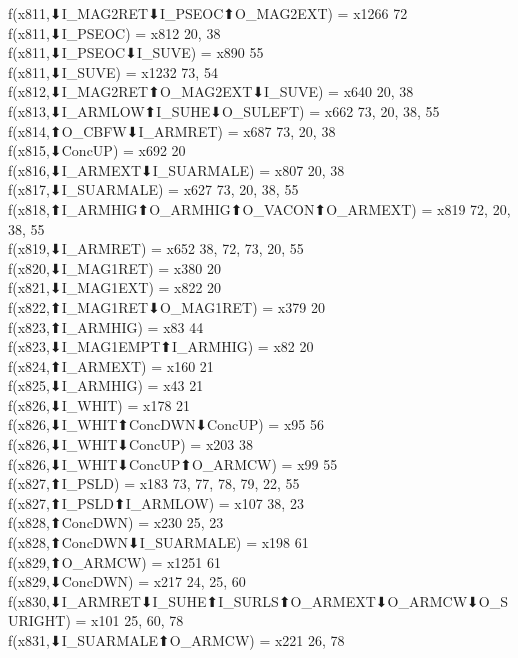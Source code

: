 f(x811,⬇I_MAG2RET⬇I_PSEOC⬆O_MAG2EXT) = x1266 {72} \\
f(x811,⬇I_PSEOC) = x812 {20, 38} \\
f(x811,⬇I_PSEOC⬇I_SUVE) = x890 {55} \\
f(x811,⬇I_SUVE) = x1232 {73, 54} \\
f(x812,⬇I_MAG2RET⬆O_MAG2EXT⬇I_SUVE) = x640 {20, 38} \\
f(x813,⬇I_ARMLOW⬆I_SUHE⬇O_SULEFT) = x662 {73, 20, 38, 55} \\
f(x814,⬆O_CBFW⬇I_ARMRET) = x687 {73, 20, 38} \\
f(x815,⬇ConcUP) = x692 {20} \\
f(x816,⬇I_ARMEXT⬇I_SUARMALE) = x807 {20, 38} \\
f(x817,⬇I_SUARMALE) = x627 {73, 20, 38, 55} \\
f(x818,⬆I_ARMHIG⬆O_ARMHIG⬆O_VACON⬆O_ARMEXT) = x819 {72, 20, 38, 55} \\
f(x819,⬇I_ARMRET) = x652 {38, 72, 73, 20, 55} \\
f(x820,⬇I_MAG1RET) = x380 {20} \\
f(x821,⬇I_MAG1EXT) = x822 {20} \\
f(x822,⬆I_MAG1RET⬇O_MAG1RET) = x379 {20} \\
f(x823,⬆I_ARMHIG) = x83 {44} \\
f(x823,⬇I_MAG1EMPT⬆I_ARMHIG) = x82 {20} \\
f(x824,⬆I_ARMEXT) = x160 {21} \\
f(x825,⬇I_ARMHIG) = x43 {21} \\
f(x826,⬇I_WHIT) = x178 {21} \\
f(x826,⬇I_WHIT⬆ConcDWN⬇ConcUP) = x95 {56} \\
f(x826,⬇I_WHIT⬇ConcUP) = x203 {38} \\
f(x826,⬇I_WHIT⬇ConcUP⬆O_ARMCW) = x99 {55} \\
f(x827,⬆I_PSLD) = x183 {73, 77, 78, 79, 22, 55} \\
f(x827,⬆I_PSLD⬆I_ARMLOW) = x107 {38, 23} \\
f(x828,⬆ConcDWN) = x230 {25, 23} \\
f(x828,⬆ConcDWN⬇I_SUARMALE) = x198 {61} \\
f(x829,⬆O_ARMCW) = x1251 {61} \\
f(x829,⬇ConcDWN) = x217 {24, 25, 60} \\
f(x830,⬇I_ARMRET⬇I_SUHE⬆I_SURLS⬆O_ARMEXT⬇O_ARMCW⬇O_SURIGHT) = x101 {25, 60, 78} \\
f(x831,⬇I_SUARMALE⬆O_ARMCW) = x221 {26, 78} \\
